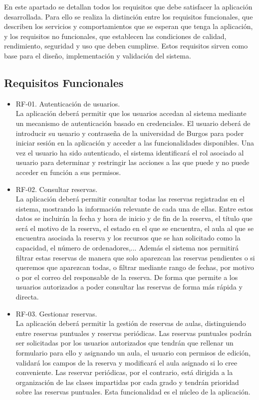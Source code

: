 En este apartado se detallan todos los requisitos que debe  satisfacer la aplicación desarrollada. Para ello se realiza la distinción entre los requisitos funcionales, que describen los servicios y comportamientos que se esperan que tenga la aplicación, y los requisitos no funcionales, que establecen las condiciones de calidad, rendimiento, seguridad y uso que deben cumplirse. Estos requisitos sirven como base para el diseño, implementación y validación del sistema.

\subsection{Requisitos Funcionales}
\begin{itemize}
	\item RF-01. Autenticación de usuarios.
	\\La aplicación deberá permitir que los usuarios accedan al sistema mediante un mecanismo de autenticación basado en credenciales. El usuario deberá de introducir su usuario y contraseña de la universidad de Burgos para poder iniciar sesión en la aplicación y acceder a las funcionalidades disponibles. Una vez el usuario ha sido autenticado, el sistema identificará el rol asociado al usuario para determinar y restringir las acciones a las que puede y no puede acceder en función a sus permisos.
	\item RF-02. Consultar reservas. 
	\\La aplicación deberá permitir consultar todas las reservas registradas en el sistema, mostrando la información relevante de cada una de ellas. Entre estos datos se incluirán la fecha y hora de inicio y de fin de la reserva, el título que será el motivo de la reserva, el estado en el que se encuentra, el aula al que se encuentra asociada la reserva y los recursos que se han solicitado como la capacidad, el número de ordenadores,... Además el sistema nos permitirá filtrar estas reservas de manera que solo aparezcan las reservas pendientes o si queremos que aparezcan todas, o filtrar mediante rango de fechas, por motivo o por el correo del responsable de la reserva. De forma que permite a los usuarios autorizados a poder consultar las reservas de forma más rápida y directa.
	\item RF-03. Gestionar reservas.
	\\La aplicación deberá permitir la gestión de reservas de aulas, distinguiendo entre reservas puntuales y reservas periódicas. Las reservas puntuales podrán ser solicitadas por los usuarios autorizados que tendrán que rellenar un formulario para ello y asignando un aula, el usuario con permisos de edición, validará los campos de la reserva y modificará el aula asignado si lo cree conveniente. Las reservar periódicas, por el contrario, está dirigida a la organización de las clases impartidas por cada grado y tendrán prioridad sobre las reservas puntuales. Esta funcionalidad es el núcleo de la aplicación.

\end{itemize}
